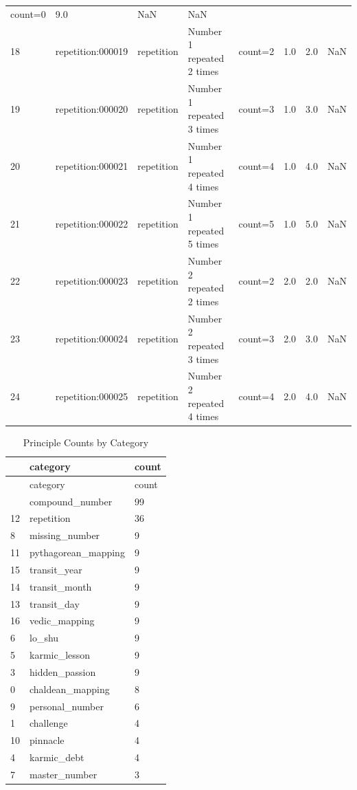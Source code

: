 \documentclass[
  american,
  11pt,
  oneside,
  openany]{article}
\begin{document}
\begin{longtable}[]{@{}llllllll@{}}
count=0 & 9.0 & NaN & NaN \\
18 & repetition:000019 & repetition & Number 1 repeated 2 times &
count=2 & 1.0 & 2.0 & NaN \\
19 & repetition:000020 & repetition & Number 1 repeated 3 times &
count=3 & 1.0 & 3.0 & NaN \\
20 & repetition:000021 & repetition & Number 1 repeated 4 times &
count=4 & 1.0 & 4.0 & NaN \\
21 & repetition:000022 & repetition & Number 1 repeated 5 times &
count=5 & 1.0 & 5.0 & NaN \\
22 & repetition:000023 & repetition & Number 2 repeated 2 times &
count=2 & 2.0 & 2.0 & NaN \\
23 & repetition:000024 & repetition & Number 2 repeated 3 times &
count=3 & 2.0 & 3.0 & NaN \\
24 & repetition:000025 & repetition & Number 2 repeated 4 times &
count=4 & 2.0 & 4.0 & NaN \\
\end{longtable}

\label{num-catalog-counts}
\begin{longtable}[]{@{}lll@{}}
\caption{Principle Counts by Category}\tabularnewline
\toprule\noalign{}
& category & count \\
\midrule\noalign{}
\endfirsthead
\toprule\noalign{}
& category & count \\
\midrule\noalign{}
\endhead
\bottomrule\noalign{}
\endlastfoot
2 & compound\_number & 99 \\
12 & repetition & 36 \\
8 & missing\_number & 9 \\
11 & pythagorean\_mapping & 9 \\
15 & transit\_year & 9 \\
14 & transit\_month & 9 \\
13 & transit\_day & 9 \\
16 & vedic\_mapping & 9 \\
6 & lo\_shu & 9 \\
5 & karmic\_lesson & 9 \\
3 & hidden\_passion & 9 \\
0 & chaldean\_mapping & 8 \\
9 & personal\_number & 6 \\
1 & challenge & 4 \\
10 & pinnacle & 4 \\
4 & karmic\_debt & 4 \\
7 & master\_number & 3 \\
\end{longtable}
\end{document}
